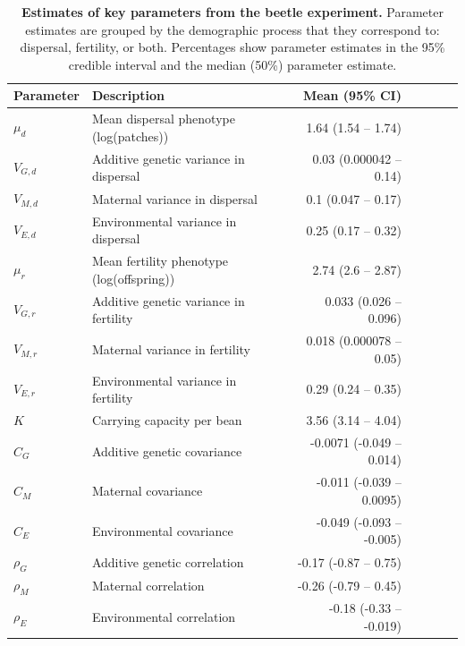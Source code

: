 \documentclass[11pt]{article}
\begin{document}
\renewcommand{\thetable}{\arabic{table}}
\setcounter{table}{0}

\newpage{}
\begin{table}[h]
\centering
\label{Estimates of key parameters from the beetle experiment}
\caption[Estimates of key parameters from the beetle experiment]{\textbf{Estimates of key parameters from the beetle experiment.} Parameter estimates are grouped by the demographic process that they correspond to: dispersal, fertility, or both. Percentages show parameter estimates in the 95\% credible interval and the median (50\%) parameter estimate.}\label{corr:estimates}\vspace{0.1in}
\begin{tabularx}{0.95\linewidth}{lXrrrrr}
\toprule
Parameter   & Description                               & Mean (95\% CI) \\ \midrule
$\mu_{d}$   & Mean dispersal phenotype (log(patches)) & 1.64 (1.54 -- 1.74) \\
$V_{G,d}$   & Additive genetic variance in dispersal &  0.03 (0.000042 -- 0.14)  \\
$V_{M,d}$   & Maternal variance in dispersal    &  0.1 (0.047 -- 0.17)  \\ 
$V_{E,d}$   & Environmental variance in dispersal  &  0.25 (0.17 -- 0.32)  \\ \midrule
$\mu_{r}$   & Mean fertility phenotype (log(offspring)) &  2.74 (2.6 -- 2.87)  \\
$V_{G,r}$   & Additive genetic variance in fertility &  0.033 (0.026 -- 0.096)  \\
$V_{M,r}$   & Maternal variance in fertility &  0.018 (0.000078 -- 0.05)  \\
$V_{E,r}$   & Environmental variance in fertility    &  0.29 (0.24 -- 0.35) \\
$K$         & Carrying capacity per bean   &  3.56 (3.14 -- 4.04)  \\ \midrule
$C_{G}$     & Additive genetic covariance &  -0.0071 (-0.049 -- 0.014) \\
$C_{M}$     & Maternal covariance & -0.011 (-0.039 -- 0.0095) \\
$C_{E}$     & Environmental covariance   & -0.049 (-0.093 -- -0.005)  \\
$\rho_{G}$  & Additive genetic correlation  &  -0.17 (-0.87 -- 0.75)\\
$\rho_{M}$  & Maternal correlation  &  -0.26 (-0.79 -- 0.45) \\
$\rho_{E}$  & Environmental correlation     &  -0.18 (-0.33 -- -0.019) \\
\bottomrule
\end{tabularx}
\end{table}
\end{document}
